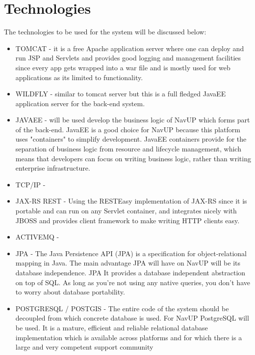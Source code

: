 
\section{Technologies}
The technologies to be used for the system will be discussed below:
\begin{itemize}
	\item TOMCAT - it is a free Apache application server where one can deploy and run JSP and Servlets and provides good logging and management facilities since every app gets wrapped into a war file and is mostly used for web applications as its limited to functionality.
	
	\item WILDFLY - similar to tomcat server but this is a full fledged JavaEE application server for the back-end system.
	
	\item JAVAEE - will be used develop the business logic of NavUP which forms part of the back-end. JavaEE is a good choice for NavUP because this platform uses "containers" to simplify development. JavaEE containers provide for the separation of business logic from resource and lifecycle management, which means that developers can focus on writing business logic, rather than writing enterprise infrastructure. 
	
	\item TCP/IP - 
	
	\item JAX-RS REST - Using the RESTEasy implementation of JAX-RS since it is portable and can run on any Servlet container, and integrates nicely with JBOSS and provides client framework to make writing HTTP clients easy.
	
	\item ACTIVEMQ - 
	
	\item JPA - The Java Persistence API (JPA) is a specification for object-relational mapping in Java. The main advantage JPA will have on NavUP will be its database independence. JPA It provides a database independent abstraction on top of SQL. As long as you're not using any native queries, you don't have to worry about database portability. 
	
	\item POSTGRESQL / POSTGIS - The entire code of the system should be decoupled from which concrete database is used. For NavUP PostgreSQL will be used. It is a mature, efficient and reliable relational database implementation which is available across platforms and for which there is a large and very competent support community
	

\end{itemize}
